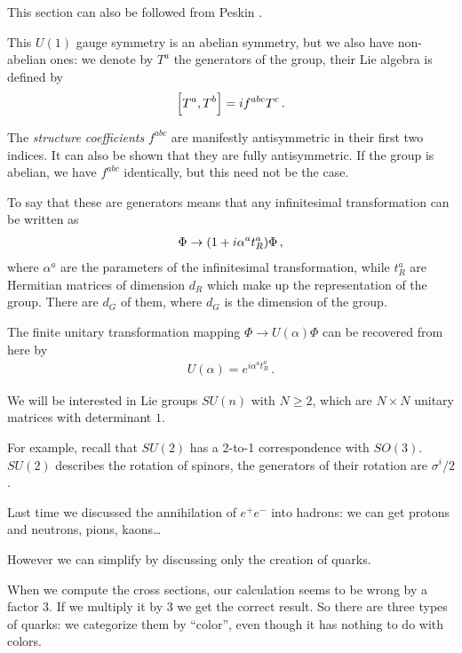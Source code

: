 \documentclass[main.tex]{subfiles}
\begin{document}
This section can also be followed from Peskin \cite[sec.\ II.11]{peskinConceptsElementaryParticle2019}.

This \(U(1)\) gauge symmetry is an abelian symmetry, but we also have non-abelian ones: we denote by \(T^{a}\) the generators of the group, their Lie algebra is defined by 
%
\begin{align}
\qty[T^{a}, T^{b}] = if^{abc} T^{c}
\,.
\end{align}

The \emph{structure coefficients} \(f^{abc}\) are manifestly antisymmetric in their first two indices. It can also be shown that they are fully antisymmetric. If the group is abelian, we have \(f^{abc}\) identically, but this need not be the case.

To say that these are generators means that any infinitesimal transformation can be written as 
%
\begin{align}
\Phi \to \qty(1 + i \alpha^{a} t^{a}_{R}) \Phi 
\,,
\end{align}
%
where \(\alpha^{a}\) are the parameters of the infinitesimal transformation, while \(t^{a}_{R}\) are Hermitian matrices of dimension \(d_R\) which make up the representation of the group. There are \(d_G\) of them, where \(d_G\) is the dimension of the group.

The finite unitary transformation mapping \(\Phi \to U(\alpha ) \Phi \) can be recovered from here by 
%
\begin{align}
U(\alpha ) = e^{i \alpha^{a} t^{a}_{R}} 
\,.
\end{align}

We will be interested in Lie groups \(SU(n)\) with \(N\geq 2\), which are \(N \times N\) unitary matrices with determinant \(1\).

For example, recall that \(SU(2)\) has a 2-to-1 correspondence with \(SO(3)\). \(SU(2)\) describes the rotation of spinors, the generators of their rotation are \(\sigma^{i} / 2\). 

Last time we discussed the annihilation  of \(e^{+} e^{-}\) into hadrons: we can get protons and neutrons, pions, kaons\dots

However we can simplify by discussing only the creation of quarks. 

When we compute the cross sections, our calculation seems to be wrong by a factor 3. If we multiply it by 3 we get the correct result. 
So there are three types of quarks: we categorize them by ``color'', even though it has nothing to do with colors. 
\end{document}
